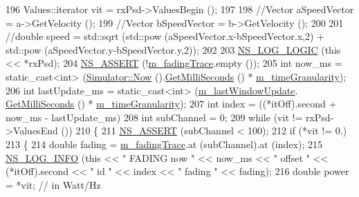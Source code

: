 \begin{DoxyCode}
196   Values::iterator vit = rxPsd->ValuesBegin ();
197   
198   \textcolor{comment}{//Vector aSpeedVector = a->GetVelocity ();}
199   \textcolor{comment}{//Vector bSpeedVector = b->GetVelocity ();}
200   
201   \textcolor{comment}{//double speed = std::sqrt (std::pow (aSpeedVector.x-bSpeedVector.x,2) + std::pow
       (aSpeedVector.y-bSpeedVector.y,2));}
202 
203   \hyperlink{group__logging_ga88acd260151caf2db9c0fc84997f45ce}{NS\_LOG\_LOGIC} (\textcolor{keyword}{this} << *rxPsd);
204   \hyperlink{assert_8h_a6dccdb0de9b252f60088ce281c49d052}{NS\_ASSERT} (!\hyperlink{classns3_1_1TraceFadingLossModel_ad5a29acc6d4d445fbd31c87f5c750c4d}{m\_fadingTrace}.empty ());
205   \textcolor{keywordtype}{int} now\_ms = \textcolor{keyword}{static\_cast<}\textcolor{keywordtype}{int}\textcolor{keyword}{>} (\hyperlink{classns3_1_1Simulator_ac3178fa975b419f7875e7105be122800}{Simulator::Now} ().\hyperlink{classns3_1_1Time_aba3428a8b6c4c8d9014ce44145081f34}{GetMilliSeconds} () * 
      \hyperlink{classns3_1_1TraceFadingLossModel_a279117b6f003c8ad4fe1a32f49ddae18}{m\_timeGranularity});
206   \textcolor{keywordtype}{int} lastUpdate\_ms = \textcolor{keyword}{static\_cast<}\textcolor{keywordtype}{int}\textcolor{keyword}{>} (\hyperlink{classns3_1_1TraceFadingLossModel_a3e52ec88812339f8ecf070b9f7645a69}{m\_lastWindowUpdate}.
      \hyperlink{classns3_1_1Time_aba3428a8b6c4c8d9014ce44145081f34}{GetMilliSeconds} () * \hyperlink{classns3_1_1TraceFadingLossModel_a279117b6f003c8ad4fe1a32f49ddae18}{m\_timeGranularity});
207   \textcolor{keywordtype}{int} index = ((*itOff).second + now\_ms - lastUpdate\_ms) %
208   \textcolor{keywordtype}{int} subChannel = 0;
209   \textcolor{keywordflow}{while} (vit != rxPsd->ValuesEnd ())
210     \{
211       \hyperlink{assert_8h_a6dccdb0de9b252f60088ce281c49d052}{NS\_ASSERT} (subChannel < 100);
212       \textcolor{keywordflow}{if} (*vit != 0.)
213         \{
214           \textcolor{keywordtype}{double} fading = \hyperlink{classns3_1_1TraceFadingLossModel_ad5a29acc6d4d445fbd31c87f5c750c4d}{m\_fadingTrace}.at (subChannel).at (index);
215           \hyperlink{group__logging_gafbd73ee2cf9f26b319f49086d8e860fb}{NS\_LOG\_INFO} (\textcolor{keyword}{this} << \textcolor{stringliteral}{" FADING now "} << now\_ms << \textcolor{stringliteral}{" offset "} << (*itOff).second << \textcolor{stringliteral}{" id
       "} << index << \textcolor{stringliteral}{" fading "} << fading);
216           \textcolor{keywordtype}{double} power = *vit; \textcolor{comment}{// in Watt/Hz}

\end{DoxyCode}
